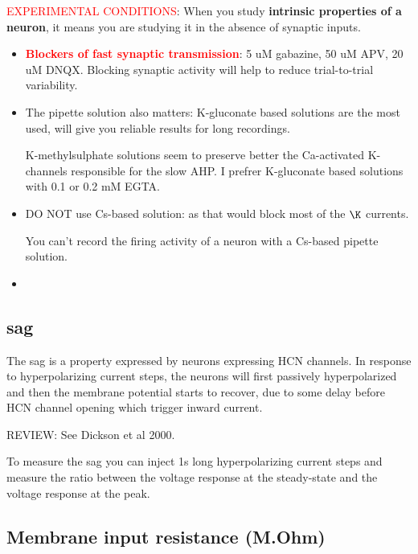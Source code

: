 \textcolor{red}{EXPERIMENTAL CONDITIONS}: When you study {\bf intrinsic
properties of a neuron}, it means you are studying it in the absence of synaptic
inputs.
\begin{itemize}

  \item \textcolor{red}{\bf Blockers of fast synaptic transmission}: 5 uM
  gabazine, 50 uM APV, 20 uM DNQX. Blocking synaptic activity will help to
  reduce trial-to-trial variability. 
  
  \item  The pipette solution also matters: K-gluconate based solutions are the
  most used, will give you reliable results for long recordings.
  
  K-methylsulphate solutions seem to preserve better the Ca-activated K-channels
  responsible for the slow AHP. I prefrer K-gluconate based solutions with 0.1
  or 0.2 mM EGTA.  
  
  \item DO NOT use Cs-based solution: as that would block most of the $\K$
  currents.
  
You can't record the firing activity of a neuron with a Cs-based pipette
solution.

  \item  
\end{itemize}


\subsection{sag}
\label{sec:sag}
\label{sec:passive-properties-sag}

The sag is a property expressed by neurons expressing HCN channels. In response
to hyperpolarizing current steps, the neurons will first passively
hyperpolarized and then the membrane potential starts to recover, due to some
delay before HCN channel opening which trigger inward current.

REVIEW: See Dickson et al 2000.

To measure the sag you can inject 1s long hyperpolarizing current steps and
measure the ratio between the voltage response at the steady-state and the
voltage response at the peak.


\subsection{Membrane input resistance (M.Ohm)}
\label{sec:passive-properties-input-resistance}

